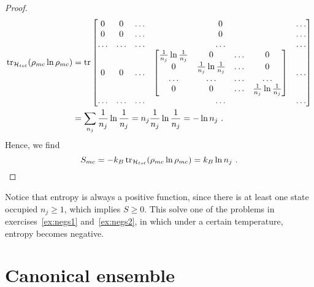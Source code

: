 \begin{proof}
\begin{equation*}
\begin{aligned}
            \operatorname{tr}_{\mathcal H_{tot}} ( \rho_{mc} \ln \rho_{mc}) & = \operatorname{tr} \begin{bmatrix}
                0 & 0 & \ldots & 0 & \ldots  \\ 
                0 & 0 & \ldots & 0 & \ldots  \\ 
                \ldots & \ldots & \ldots & \ldots & \ldots  \\
                0 & 0 & \ldots & \begin{bmatrix}
                    \frac{1}{n_j} \ln \frac{1}{n_j} & 0 & \ldots & 0 \\
                    0 & \frac{1}{n_j} \ln \frac{1}{n_j} & \ldots & 0 \\
                    \ldots & \ldots & \ldots & \ldots \\
                    0 & 0 & \ldots & \frac{1}{n_j} \ln \frac{1}{n_j} \\
                \end{bmatrix} & \ldots \\
                \ldots & \ldots & \ldots & \ldots & \ldots  \\
            \end{bmatrix} \\ & = \sum_{n_j} \frac{1}{n_j} \ln \frac{1}{n_j} = n_j \frac{1}{n_j} \ln \frac{1}{n_j} = - \ln n_j ~.
        \end{aligned}
        \end{equation*}
        Hence, we find
        \begin{equation*}
            S_{mc} = - k_B \operatorname{tr}_{\mathcal H_{tot}} ( \rho_{mc} \ln \rho_{mc}) = k_B \ln n_j ~.
        \end{equation*}
    \end{proof}

    Notice that entropy is always a positive function, since there is at least one state occupied $n_j \geq 1$, which implies $S \geq 0$. This solve one of the problems in exercises~\eqref{ex:negs1} and~\eqref{ex:negs2}, in which under a certain temperature, entropy becomes negative.

\section{Canonical ensemble}

